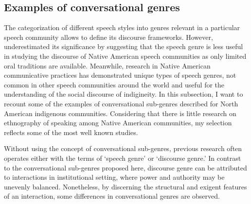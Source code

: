 \documentclass[12pt]{article}
\begin{document}
\subsection{Examples of conversational genres}
The categorization of different speech styles into genres relevant in a particular speech community allows to define its discourse frameworks. However, \textcite[p. 102]{dementyev2015} underestimated its significance by suggesting that the speech genre is less useful in studying the discourse of Native American speech communities as only limited oral traditions are available. Meanwhile, research in Native American communicative practices has demonstrated unique types of speech genres, not common in other speech communities around the world and useful for the understanding of the social discourse of indigineity. In this subsection, I want to recount some of the examples of conversational sub-genres described for North American indigenous communities. Considering that there is little research on ethnography of speaking among Native American communities, my selection reflects some of the most well known studies.

Without using the concept of conversational sub-genres, previous research often operates either with the terms of `speech genre' or `discourse genre.' In contrast to the conversational sub-genres proposed here, discourse genre can be attributed to interactions in institutional setting, where power and authority may be unevenly balanced. Nonetheless, by discerning the structural and exigent features of an interaction, some differences in conversational genres are observed. 
\end{document}
